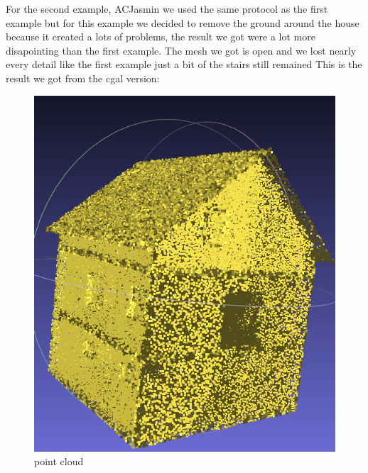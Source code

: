 \documentclass{article}
\begin{document}
For the second example, ACJasmin we used the same protocol as the first example but for 
this example we decided to remove the ground around the house because it created a lots of problems,
the result we got were a lot more disapointing than the first example.
The mesh we got is open and we lost nearly every detail like the first example 
just a bit of the stairs still remained
This is the result we got from the cgal version:
\vspace{\baselineskip}
\begin{figure}[H]
  \centering
  \begin{minipage}[t]{0.29\textwidth}
    \includegraphics[width=\textwidth]{../../images/screen_kinetic/ACJasmin_point_cloud.png}
    \caption*{point cloud}
  \end{minipage}
  \hspace{0.05\textwidth}
  \begin{minipage}[t]{0.29\textwidth}

\end{minipage}
\end{figure}
\end{document}
